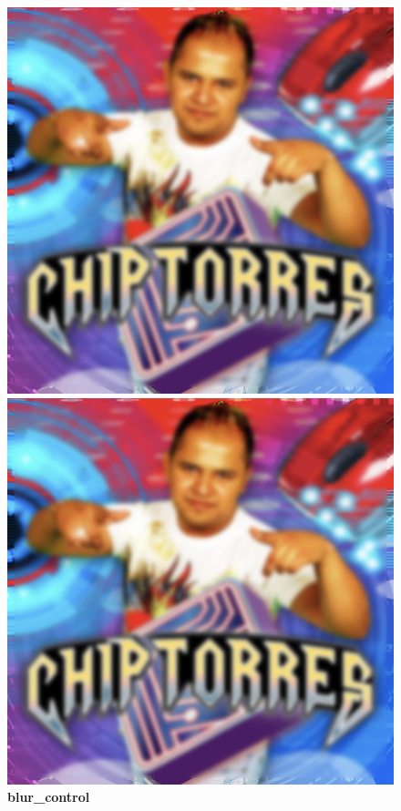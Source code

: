 \begin{figure}[H]
	\centering
	\begin{minipage}{.3\textwidth}
		\centering
		\includegraphics[width=\linewidth]{imgs/chip_hd_v1.jpg}
		\caption{\textbf{blur\_control}}
		\label{fig:blur_prec_control}
	\end{minipage}\hfill
	\begin{minipage}{.3\textwidth}
		\centering
		\includegraphics[width=\linewidth]{imgs/chip_hd_v1.jpg}

\end{minipage}
\end{figure}
